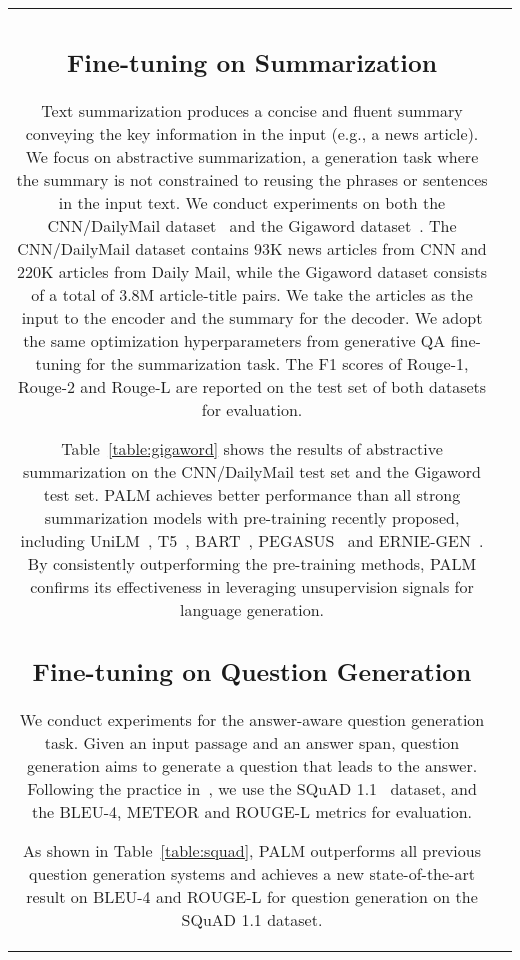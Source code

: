 \documentclass[11pt,a4paper]{article}
\newcommand{\method}{PALM\xspace}
\begin{document}
\begin{table*}[t]
\begin{tabular}{ c | l }
\subsection{Fine-tuning on Summarization}
Text summarization produces a concise and fluent summary conveying the key information in the input (e.g., a news article). We focus on abstractive summarization, a generation task where the summary is not constrained to reusing the phrases or sentences in the input text. We conduct experiments on both the CNN/DailyMail dataset~\cite{karl2015teaching} and the Gigaword dataset~\cite{gigaword}. The CNN/DailyMail dataset contains 93K news articles from CNN and 220K articles from Daily Mail, while the Gigaword dataset consists of a total of 3.8M article-title pairs. We take the articles as the input to the encoder and the summary for the decoder. We adopt the same optimization hyperparameters from generative QA fine-tuning for the summarization task. The F1 scores of Rouge-1, Rouge-2 and Rouge-L are reported on the test set of both datasets for evaluation.

Table~\ref{table:gigaword} shows the results of abstractive summarization on the CNN/DailyMail test set and the Gigaword test set. PALM achieves better performance than all strong summarization models with pre-training recently proposed, including UniLM~\cite{unilm2019}, T5~\cite{raffel2019exploring}, BART~\cite{bart2019}, PEGASUS~\cite{pegasus} and ERNIE-GEN~\cite{ernie-gen}. By consistently outperforming the pre-training methods, \method confirms its effectiveness in leveraging unsupervision signals for language generation.

\subsection{Fine-tuning on Question Generation}
We conduct experiments for the answer-aware question generation task. Given an input passage and an answer span, question generation aims to generate a question that leads to the answer. Following the practice in~\cite{zhao-etal-2018-paragraph,unilm2019}, we use the SQuAD 1.1~\cite{squad} dataset, and the BLEU-4, METEOR and ROUGE-L metrics for evaluation.

As shown in Table~\ref{table:squad}, \method outperforms all previous question generation systems and achieves a new state-of-the-art result on BLEU-4 and ROUGE-L for question generation on the SQuAD 1.1 dataset.


\end{tabular}
\end{table*}
\end{document}
